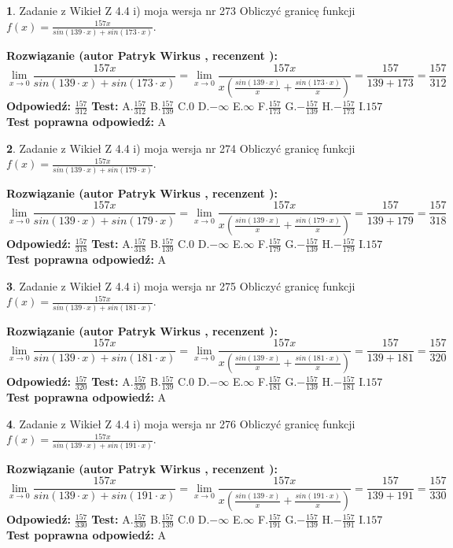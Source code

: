 \documentclass[12pt, a4paper]{article}
\theoremstyle{definition} %
\newtheorem{zad}{}
\newcommand{\zadStart}[1]{\begin{zad}#1\newline}
\newcommand{\zadStop}{\end{zad}}
\newcommand{\rozwStart}[2]{\noindent \textbf{Rozwiązanie (autor #1 , recenzent #2): }\newline}
\newcommand{\rozwStop}{\newline}
\newcommand{\odpStart}{\noindent \textbf{Odpowiedź:}\newline}
\newcommand{\odpStop}{\newline}
\newcommand{\testStart}{\noindent \textbf{Test:}\newline}
\newcommand{\testStop}{\newline}
\newcommand{\kluczStart}{\noindent \textbf{Test poprawna odpowiedź:}\newline}
\newcommand{\kluczStop}{\newline}
\begin{document}
\zadStart{Zadanie z Wikieł Z 4.4 i) moja wersja nr 273}
Obliczyć granicę funkcji $f(x)=\frac{157x}{sin(139\cdot x) +sin(173\cdot x)}$.
\zadStop
\rozwStart{Patryk Wirkus}{}
$$\lim\limits_{x\to 0}\frac{157x}{sin(139\cdot x) +sin(173\cdot x)}=\lim\limits_{x\to 0}\frac{157x}{x(\frac{sin(139\cdot x)}{x}+\frac{sin(173\cdot x)}{x})}=\frac{157}{139+173} = \frac{157}{312}$$
\rozwStop
\odpStart
$\frac{157}{312}$
\odpStop
\testStart
A.$\frac{157}{312}$
B.$\frac{157}{139}$
C.$0$
D.$-\infty$
E.$\infty$
F.$\frac{157}{173}$
G.$-\frac{157}{139}$
H.$-\frac{157}{173}$
I.$157$
\testStop
\kluczStart
A
\kluczStop



\zadStart{Zadanie z Wikieł Z 4.4 i) moja wersja nr 274}
Obliczyć granicę funkcji $f(x)=\frac{157x}{sin(139\cdot x) +sin(179\cdot x)}$.
\zadStop
\rozwStart{Patryk Wirkus}{}
$$\lim\limits_{x\to 0}\frac{157x}{sin(139\cdot x) +sin(179\cdot x)}=\lim\limits_{x\to 0}\frac{157x}{x(\frac{sin(139\cdot x)}{x}+\frac{sin(179\cdot x)}{x})}=\frac{157}{139+179} = \frac{157}{318}$$
\rozwStop
\odpStart
$\frac{157}{318}$
\odpStop
\testStart
A.$\frac{157}{318}$
B.$\frac{157}{139}$
C.$0$
D.$-\infty$
E.$\infty$
F.$\frac{157}{179}$
G.$-\frac{157}{139}$
H.$-\frac{157}{179}$
I.$157$
\testStop
\kluczStart
A
\kluczStop



\zadStart{Zadanie z Wikieł Z 4.4 i) moja wersja nr 275}
Obliczyć granicę funkcji $f(x)=\frac{157x}{sin(139\cdot x) +sin(181\cdot x)}$.
\zadStop
\rozwStart{Patryk Wirkus}{}
$$\lim\limits_{x\to 0}\frac{157x}{sin(139\cdot x) +sin(181\cdot x)}=\lim\limits_{x\to 0}\frac{157x}{x(\frac{sin(139\cdot x)}{x}+\frac{sin(181\cdot x)}{x})}=\frac{157}{139+181} = \frac{157}{320}$$
\rozwStop
\odpStart
$\frac{157}{320}$
\odpStop
\testStart
A.$\frac{157}{320}$
B.$\frac{157}{139}$
C.$0$
D.$-\infty$
E.$\infty$
F.$\frac{157}{181}$
G.$-\frac{157}{139}$
H.$-\frac{157}{181}$
I.$157$
\testStop
\kluczStart
A
\kluczStop



\zadStart{Zadanie z Wikieł Z 4.4 i) moja wersja nr 276}
Obliczyć granicę funkcji $f(x)=\frac{157x}{sin(139\cdot x) +sin(191\cdot x)}$.
\zadStop
\rozwStart{Patryk Wirkus}{}
$$\lim\limits_{x\to 0}\frac{157x}{sin(139\cdot x) +sin(191\cdot x)}=\lim\limits_{x\to 0}\frac{157x}{x(\frac{sin(139\cdot x)}{x}+\frac{sin(191\cdot x)}{x})}=\frac{157}{139+191} = \frac{157}{330}$$
\rozwStop
\odpStart
$\frac{157}{330}$
\odpStop
\testStart
A.$\frac{157}{330}$
B.$\frac{157}{139}$
C.$0$
D.$-\infty$
E.$\infty$
F.$\frac{157}{191}$
G.$-\frac{157}{139}$
H.$-\frac{157}{191}$
I.$157$
\testStop
\kluczStart
A
\kluczStop
\end{document}
